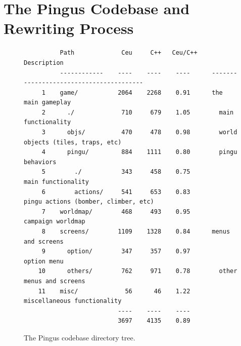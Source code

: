 \documentclass[10pt, conference, compsocconf]{IEEEtran}
\begin{document}
\section{The Pingus Codebase and Rewriting Process}
\label{sec.codebase}


\begin{figure}
{\footnotesize
\begin{verbatim}
          Path             Ceu     C++   Ceu/C++    Description
          ------------    ----    ----    ----      ----------------------------------------
     1    game/           2064    2268    0.91      the main gameplay
     2      ./             710     679    1.05        main functionality
     3      objs/          470     478    0.98        world objects (tiles, traps, etc)
     4      pingu/         884    1111    0.80        pingu behaviors
     5        ./           343     458    0.75          main functionality
     6        actions/     541     653    0.83          pingu actions (bomber, climber, etc)
     7    worldmap/        468     493    0.95      campaign worldmap
     8    screens/        1109    1328    0.84      menus and screens
     9      option/        347     357    0.97        option menu
    10      others/        762     971    0.78        other menus and screens
    11    misc/             56      46    1.22      miscellaneous functionality
                          ----    ----    ----
                          3697    4135    0.89
\end{verbatim}
}
\caption{The Pingus codebase directory tree.
\label{tab.tree}
}
\end{figure}
\end{document}
